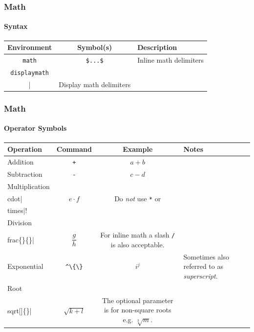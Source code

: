 \begin{frame}
    \frametitle{Math}
    \framesubtitle{Syntax}
    \begin{center}
    \begin{tabular}{ccl}
        \textbf{Environment}
            & \textbf{Symbol(s)}
            & \textbf{Description}\\
    \toprule[1.2pt]
        \lstinline|math|
            & \lstinline|$...$| 
            & Inline math delimiters\\
    \midrule\pause
        \lstinline|displaymath|
            & \lstinline|\\[...\\]|
            & Display math delimiters\\
    \end{tabular}
    \end{center}
\end{frame}

\begin{frame}
    \frametitle{Math}
    \framesubtitle{Operator Symbols}
    \begin{center}
    \begin{tabular}{l c c >{\raggedright\arraybackslash}m{5cm}}
        \textbf{Operation}
        & \textbf{Command}
        & \textbf{Example}
        & \textbf{Notes}\\
    \toprule[1.2pt]\pause
        Addition
        & \texttt{+}
        & $a + b$
        & \\
    \midrule\pause
        Subtraction
        & \texttt{-}
        & $c - d$
        & \\
    \midrule\pause
        Multiplication
        & \lstinline|\\cdot|
        & $e \cdot f$
        & Do \emph{not} use \texttt{*} or \lstinline|\\times|!\\
    \midrule\pause
        Division
        & \lstinline|\\frac\{\}\{\}|
        & $\dfrac{g}{h}$ %
        & For inline math a slash \texttt{/} is also acceptable.\\
    \midrule\pause
        Exponential
        & \lstinline|^\{\}|
        & $i^{j}$
        & Sometimes also referred to as \emph{superscript}.\\
    \midrule\pause
        Root
        & \lstinline|\\sqrt[]\{\}|
        & $\sqrt{k + l}$
        & The optional parameter is for non-square roots e.g. $\sqrt[3]{m}$.\\
    \end{tabular}
    \end{center}
\end{frame}

